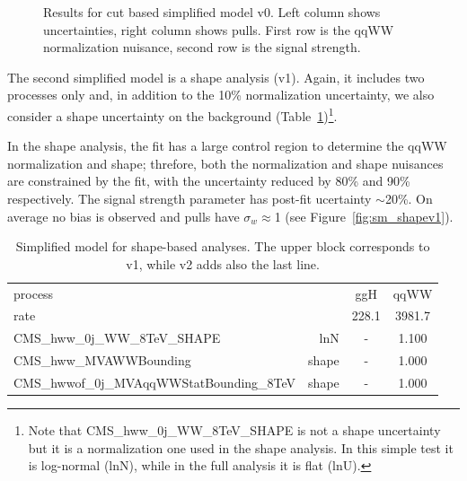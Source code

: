 \begin{figure}[!hbtp]
{}
\caption{Results for cut based simplified model v0. Left column shows uncertainties, right column shows pulls.
First row is the qqWW normalization nuisance, second row is the signal strength.}
\label{fig:sm_cut}
\end{figure}

The second simplified model is a shape analysis (v1). 
Again, it includes two processes only and, in addition to the 10\% normalization uncertainty, we also consider a shape 
uncertainty on the background (Table~\ref{tab:modelshapebased})\footnote{Note that CMS\_hww\_0j\_WW\_8TeV\_SHAPE is not
 a shape uncertainty but it is a normalization one used in the shape analysis. In this simple test it is log-normal (lnN), 
while in the full analysis it is flat (lnU).}.

In the shape analysis, the fit has a large control region to determine the qqWW normalization and shape; 
threfore, both the normalization and shape nuisances are constrained by the fit, with the uncertainty reduced 
by 80\% and 90\% respectively. The signal strength parameter has post-fit ucertainty $\sim$20\%.
On average no bias is observed and pulls have $\sigma_{w}$$\approx$1 (see Figure~\ref{fig:sm_shapev1}).

\begin{table}[!hbtp]
\begin{center}
\begin{tabular}{l r c c}
\hline
process                                   &       & ggH   & qqWW   \\
rate                                      &       & 228.1 & 3981.7 \\
CMS\_hww\_0j\_WW\_8TeV\_SHAPE             & lnN   &  -    & 1.100  \\
CMS\_hww\_MVAWWBounding                   & shape &  -    & 1.000  \\
\hline
\hline
CMS\_hwwof\_0j\_MVAqqWWStatBounding\_8TeV & shape &  -    & 1.000  \\
\hline
\end{tabular}
\caption{Simplified model for shape-based analyses. The upper block corresponds to v1, while v2 adds also the last line.}
\label{tab:modelshapebased}
\end{center}
\end{table}

